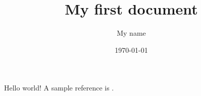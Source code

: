\documentclass{article}
\begin{document}
    \title{My first document}
    \author{My name}
    \date{\today}
    \maketitle

    Hello world! A sample reference is \cite{erbar2015equivalence}.
    
    
\end{document}
